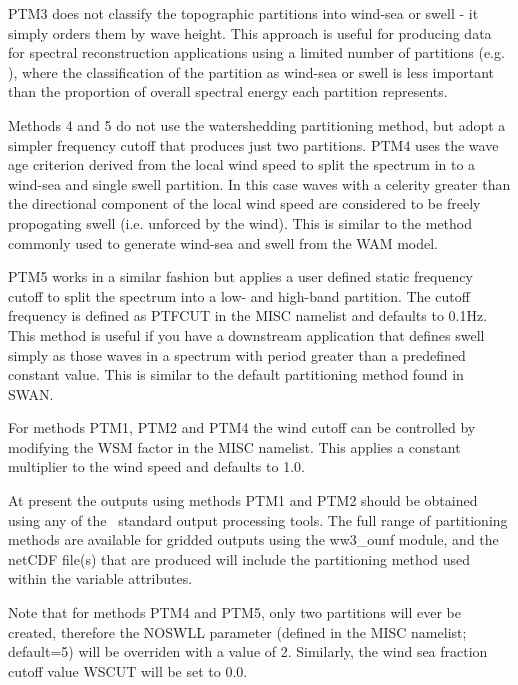 PTM3 does not classify the topographic partitions into wind-sea or swell - it simply orders
them by wave height. This approach is useful for producing data for spectral reconstruction 
applications using a limited number of partitions (e.g. \cite{pro:BSP13}), where the 
classification of the partition as wind-sea or swell is less important than the proportion
of overall spectral energy each partition represents.

Methods 4 and 5 do not use the watershedding partitioning method, but adopt
a simpler frequency cutoff that produces just two partitions. PTM4 uses the
wave age criterion derived from the local wind speed to split the spectrum in
to a wind-sea and single swell partition. In this case  waves with a celerity greater
than the directional component of the local wind speed are considered to be
freely propogating swell (i.e. unforced by the wind). This is similar to the
method commonly used to generate wind-sea and swell from the WAM model.

PTM5 works in a similar fashion but applies a user defined static frequency
cutoff to split the spectrum into a low- and high-band partition. The cutoff
frequency is defined as PTFCUT in the MISC namelist and defaults to 0.1Hz.
This method is useful if you have a downstream application that defines swell
simply as those waves in a spectrum with period greater than a predefined
constant value. This is similar to the default partitioning method found in SWAN.

For methods PTM1, PTM2 and PTM4 the wind cutoff can be controlled by modifying
the WSM factor in the MISC namelist. This applies a constant multiplier to the 
wind speed and defaults to 1.0.

At present the outputs using methods PTM1 and PTM2 should be obtained using any of the \ws\
standard output processing tools. The full range of partitioning methods are available for
gridded outputs using the ww3\_ounf module, and the netCDF file(s) that are produced will
include the partitioning method used within the variable attributes.

Note that for methods PTM4 and PTM5, only two partitions will ever be created,
therefore the NOSWLL parameter (defined in the MISC namelist; default=5) will
be overriden with a value of 2. Similarly, the wind sea fraction cutoff
value WSCUT will be set to 0.0.

